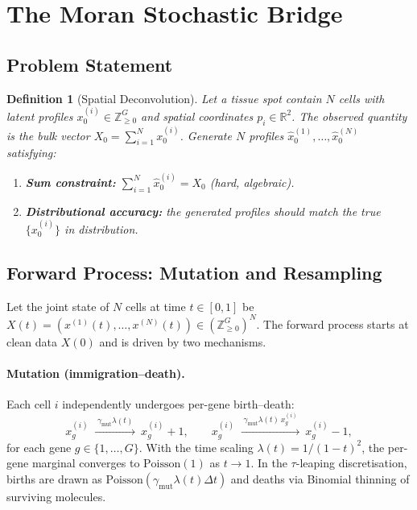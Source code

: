 \documentclass[11pt]{article}
\newtheorem{definition}{Definition}
\begin{document}
\section{The Moran Stochastic Bridge}
\label{sec:method}

\subsection{Problem Statement}

\begin{definition}[Spatial Deconvolution]
Let a tissue spot contain $N$ cells with latent profiles $x_0^{(i)} \in \mathbb{Z}_{\geq 0}^G$ and spatial coordinates $p_i \in \mathbb{R}^2$. The observed quantity is the bulk vector $X_0 = \sum_{i=1}^{N} x_0^{(i)}$. Generate $N$ profiles $\hat{x}_0^{(1)}, \ldots, \hat{x}_0^{(N)}$ satisfying:
\begin{enumerate}
  \item \textbf{Sum constraint:} $\sum_{i=1}^{N} \hat{x}_0^{(i)} = X_0$ (hard, algebraic).
  \item \textbf{Distributional accuracy:} the generated profiles should match the true $\{x_0^{(i)}\}$ in distribution.
\end{enumerate}
\end{definition}

\subsection{Forward Process: Mutation and Resampling}

Let the joint state of $N$ cells at time $t \in [0,1]$ be $X(t) = (x^{(1)}(t), \ldots, x^{(N)}(t)) \in (\mathbb{Z}_{\geq 0}^G)^N$. The forward process starts at clean data $X(0)$ and is driven by two mechanisms.

\paragraph{Mutation (immigration--death).}
Each cell $i$ independently undergoes per-gene birth--death:
\[
  x_g^{(i)} \;\xrightarrow{\;\gamma_{\text{mut}}\lambda(t)\;}\ x_g^{(i)} + 1, \qquad
  x_g^{(i)} \;\xrightarrow{\;\gamma_{\text{mut}}\lambda(t)\, x_g^{(i)}\;}\ x_g^{(i)} - 1,
\]
for each gene $g \in \{1,\ldots,G\}$. With the time scaling $\lambda(t) = 1/(1-t)^2$, the per-gene marginal converges to $\text{Poisson}(1)$ as $t \to 1$. In the $\tau$-leaping discretisation, births are drawn as $\text{Poisson}(\gamma_{\text{mut}}\lambda(t)\Delta t)$ and deaths via Binomial thinning of surviving molecules.
\end{document}
